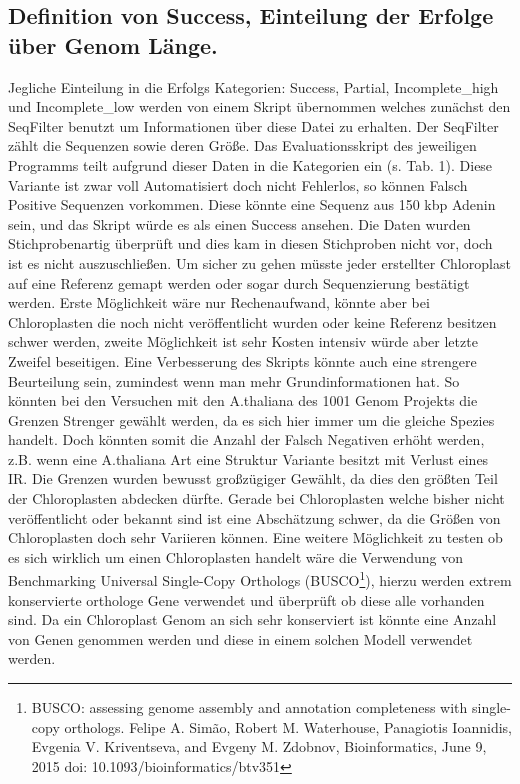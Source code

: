 \documentclass{scrartcl}
\begin{document}
\subsection{Definition von Success, Einteilung der Erfolge über Genom Länge.}
\label{sec-5-1}
Jegliche Einteilung in die Erfolgs Kategorien: Success, Partial, Incomplete\_high und Incomplete\_low werden von einem Skript übernommen welches zunächst den SeqFilter benutzt um Informationen über diese Datei zu erhalten. 
Der SeqFilter zählt die Sequenzen sowie deren Größe. Das Evaluationsskript des jeweiligen Programms teilt aufgrund dieser Daten in die Kategorien ein (s. Tab. 1). Diese Variante ist zwar voll Automatisiert
doch nicht Fehlerlos, so können Falsch Positive Sequenzen vorkommen. Diese könnte eine Sequenz aus 150 kbp Adenin sein, und das Skript würde es als einen Success ansehen. Die Daten wurden Stichprobenartig überprüft und dies 
kam in diesen Stichproben nicht vor, doch ist es nicht auszuschließen. Um sicher zu gehen müsste jeder erstellter Chloroplast auf eine Referenz gemapt werden oder sogar durch Sequenzierung bestätigt werden. Erste Möglichkeit
wäre nur Rechenaufwand, könnte aber bei Chloroplasten die noch nicht veröffentlicht wurden oder keine Referenz besitzen schwer werden, zweite Möglichkeit ist sehr Kosten intensiv würde aber letzte Zweifel beseitigen. 
Eine Verbesserung des Skripts könnte auch eine strengere Beurteilung sein, zumindest wenn man mehr Grundinformationen hat. So könnten bei den Versuchen mit den A.thaliana des 1001 Genom Projekts die Grenzen Strenger gewählt werden, 
da es sich hier immer um die gleiche Spezies handelt. Doch könnten somit die Anzahl der Falsch Negativen erhöht werden, z.B. wenn eine A.thaliana Art eine Struktur Variante besitzt mit Verlust eines IR. Die Grenzen wurden 
bewusst großzügiger Gewählt, da dies den größten Teil der Chloroplasten abdecken dürfte. Gerade bei Chloroplasten welche bisher nicht veröffentlicht oder bekannt sind ist eine Abschätzung schwer, da die Größen von Chloroplasten
doch sehr Variieren können. Eine weitere Möglichkeit zu testen ob es sich wirklich um einen Chloroplasten handelt wäre die Verwendung von Benchmarking Universal Single-Copy Orthologs (BUSCO\footnote{BUSCO: assessing genome assembly and annotation completeness with single-copy orthologs. Felipe A. Simão, Robert M. Waterhouse, Panagiotis Ioannidis, Evgenia V. Kriventseva, and Evgeny M. Zdobnov, Bioinformatics, June 9, 2015 doi: 10.1093/bioinformatics/btv351}), hierzu werden extrem konservierte
orthologe Gene verwendet und überprüft ob diese alle vorhanden sind. Da ein Chloroplast Genom an sich sehr konserviert ist könnte eine Anzahl von Genen genommen werden und diese in einem solchen Modell verwendet werden. 
\end{document}
